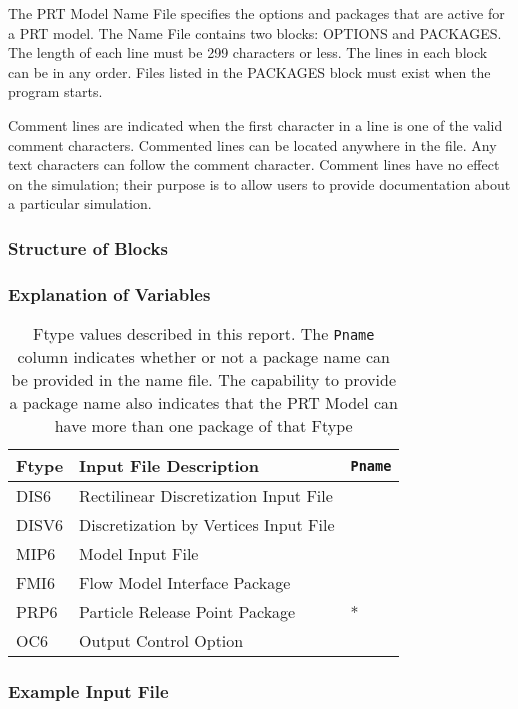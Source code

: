 The PRT Model Name File specifies the options and packages that are active for a PRT model.  The Name File contains two blocks: OPTIONS  and PACKAGES. The length of each line must be 299 characters or less. The lines in each block can be in any order.  Files listed in the PACKAGES block must exist when the program starts. 

Comment lines are indicated when the first character in a line is one of the valid comment characters.  Commented lines can be located anywhere in the file. Any text characters can follow the comment character. Comment lines have no effect on the simulation; their purpose is to allow users to provide documentation about a particular simulation. 

\vspace{5mm}
\subsubsection{Structure of Blocks}



\vspace{5mm}
\subsubsection{Explanation of Variables}
\begin{description}

\end{description}

\begin{table}[H]
\caption{Ftype values described in this report.  The \texttt{Pname} column indicates whether or not a package name can be provided in the name file.  The capability to provide a package name also indicates that the PRT Model can have more than one package of that Ftype}
\small
\begin{center}
\begin{tabular*}{\columnwidth}{l l l}
\hline
\hline
Ftype & Input File Description & \texttt{Pname}\\
\hline
DIS6 & Rectilinear Discretization Input File \\
DISV6 & Discretization by Vertices Input File \\
MIP6 & Model Input File \\
FMI6 & Flow Model Interface Package &  \\ 
PRP6 & Particle Release Point Package & * \\
OC6 & Output Control Option \\
\hline 
\end{tabular*}
\label{table:ftype-prt}
\end{center}
\normalsize
\end{table}

\vspace{5mm}
\subsubsection{Example Input File}



